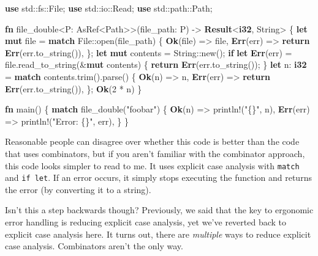 \documentclass[a4paper,]{book}
\newenvironment{Shaded}{\begin{snugshade}}{\end{snugshade}}
\newcommand{\KeywordTok}[1]{\textcolor[rgb]{0.13,0.29,0.53}{\textbf{{#1}}}}
\newcommand{\DecValTok}[1]{\textcolor[rgb]{0.00,0.00,0.81}{{#1}}}
\newcommand{\StringTok}[1]{\textcolor[rgb]{0.31,0.60,0.02}{{#1}}}
\newcommand{\OtherTok}[1]{\textcolor[rgb]{0.56,0.35,0.01}{{#1}}}
\newcommand{\NormalTok}[1]{{#1}}
\begin{document}
\begin{Shaded}
\begin{Highlighting}[]
\KeywordTok{use} \NormalTok{std::fs::File;}
\KeywordTok{use} \NormalTok{std::io::Read;}
\KeywordTok{use} \NormalTok{std::path::Path;}

\KeywordTok{fn} \NormalTok{file_double<P: AsRef<Path>>(file_path: P) -> }\KeywordTok{Result}\NormalTok{<}\KeywordTok{i32}\NormalTok{, String> \{}
    \KeywordTok{let} \KeywordTok{mut} \NormalTok{file = }\KeywordTok{match} \NormalTok{File::open(file_path) \{}
        \KeywordTok{Ok}\NormalTok{(file) => file,}
        \KeywordTok{Err}\NormalTok{(err) => }\KeywordTok{return} \KeywordTok{Err}\NormalTok{(err.to_string()),}
    \NormalTok{\};}
    \KeywordTok{let} \KeywordTok{mut} \NormalTok{contents = String::new();}
    \KeywordTok{if} \KeywordTok{let} \KeywordTok{Err}\NormalTok{(err) = file.read_to_string(&}\KeywordTok{mut} \NormalTok{contents) \{}
        \KeywordTok{return} \KeywordTok{Err}\NormalTok{(err.to_string());}
    \NormalTok{\}}
    \KeywordTok{let} \NormalTok{n: }\KeywordTok{i32} \NormalTok{= }\KeywordTok{match} \NormalTok{contents.trim().parse() \{}
        \KeywordTok{Ok}\NormalTok{(n) => n,}
        \KeywordTok{Err}\NormalTok{(err) => }\KeywordTok{return} \KeywordTok{Err}\NormalTok{(err.to_string()),}
    \NormalTok{\};}
    \KeywordTok{Ok}\NormalTok{(}\DecValTok{2} \NormalTok{* n)}
\NormalTok{\}}

\KeywordTok{fn} \NormalTok{main() \{}
    \KeywordTok{match} \NormalTok{file_double(}\StringTok{"foobar"}\NormalTok{) \{}
        \KeywordTok{Ok}\NormalTok{(n) => }\OtherTok{println!}\NormalTok{(}\StringTok{"\{\}"}\NormalTok{, n),}
        \KeywordTok{Err}\NormalTok{(err) => }\OtherTok{println!}\NormalTok{(}\StringTok{"Error: \{\}"}\NormalTok{, err),}
    \NormalTok{\}}
\NormalTok{\}}
\end{Highlighting}
\end{Shaded}

Reasonable people can disagree over whether this code is better than the
code that uses combinators, but if you aren't familiar with the
combinator approach, this code looks simpler to read to me. It uses
explicit case analysis with \texttt{match} and \texttt{if\ let}. If an
error occurs, it simply stops executing the function and returns the
error (by converting it to a string).

Isn't this a step backwards though? Previously, we said that the key to
ergonomic error handling is reducing explicit case analysis, yet we've
reverted back to explicit case analysis here. It turns out, there are
\emph{multiple} ways to reduce explicit case analysis. Combinators
aren't the only way.
\end{document}
